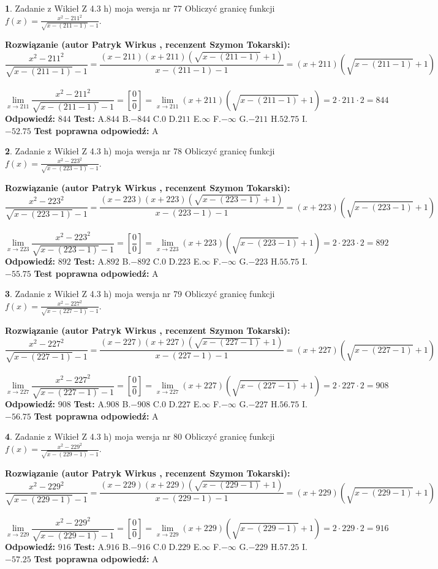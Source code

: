 \documentclass[12pt, a4paper]{article}
\theoremstyle{definition} %
\newtheorem{zad}{}
\newcommand{\zadStart}[1]{\begin{zad}#1\newline}
\newcommand{\zadStop}{\end{zad}}
\newcommand{\rozwStart}[2]{\noindent \textbf{Rozwiązanie (autor #1 , recenzent #2): }\newline}
\newcommand{\rozwStop}{\newline}
\newcommand{\odpStart}{\noindent \textbf{Odpowiedź:}\newline}
\newcommand{\odpStop}{\newline}
\newcommand{\testStart}{\noindent \textbf{Test:}\newline}
\newcommand{\testStop}{\newline}
\newcommand{\kluczStart}{\noindent \textbf{Test poprawna odpowiedź:}\newline}
\newcommand{\kluczStop}{\newline}
\begin{document}
\zadStart{Zadanie z Wikieł Z 4.3 h) moja wersja nr 77}
Obliczyć granicę funkcji $f(x)=\frac{x^{2} - 211^{2}}{\sqrt{x-(211-1)}-1}$.
\zadStop
\rozwStart{Patryk Wirkus}{Szymon Tokarski}
$$\frac{x^{2} - 211^{2}}{\sqrt{x-(211-1)}-1}=\frac{(x-211)(x+211)(\sqrt{x-(211-1)}+1)}{x-(211-1)-1}=(x+211)(\sqrt{x-(211-1)}+1)$$
\\
$$\lim\limits_{x\to 211}\frac{x^{2} - 211^{2}}{\sqrt{x-(211-1)}-1}=[\frac{0}{0}]=
\lim\limits_{x\to 211}(x+211)(\sqrt{x-(211-1)}+1) = 2\cdot211 \cdot 2 = 844$$
\rozwStop
\odpStart
$844$
\odpStop
\testStart
A.$844$
B.$-844$
C.$0$
D.$211$
E.$\infty$
F.$-\infty$
G.$-211$
H.$52.75$
I.$-52.75$
\testStop
\kluczStart
A
\kluczStop



\zadStart{Zadanie z Wikieł Z 4.3 h) moja wersja nr 78}
Obliczyć granicę funkcji $f(x)=\frac{x^{2} - 223^{2}}{\sqrt{x-(223-1)}-1}$.
\zadStop
\rozwStart{Patryk Wirkus}{Szymon Tokarski}
$$\frac{x^{2} - 223^{2}}{\sqrt{x-(223-1)}-1}=\frac{(x-223)(x+223)(\sqrt{x-(223-1)}+1)}{x-(223-1)-1}=(x+223)(\sqrt{x-(223-1)}+1)$$
\\
$$\lim\limits_{x\to 223}\frac{x^{2} - 223^{2}}{\sqrt{x-(223-1)}-1}=[\frac{0}{0}]=
\lim\limits_{x\to 223}(x+223)(\sqrt{x-(223-1)}+1) = 2\cdot223 \cdot 2 = 892$$
\rozwStop
\odpStart
$892$
\odpStop
\testStart
A.$892$
B.$-892$
C.$0$
D.$223$
E.$\infty$
F.$-\infty$
G.$-223$
H.$55.75$
I.$-55.75$
\testStop
\kluczStart
A
\kluczStop



\zadStart{Zadanie z Wikieł Z 4.3 h) moja wersja nr 79}
Obliczyć granicę funkcji $f(x)=\frac{x^{2} - 227^{2}}{\sqrt{x-(227-1)}-1}$.
\zadStop
\rozwStart{Patryk Wirkus}{Szymon Tokarski}
$$\frac{x^{2} - 227^{2}}{\sqrt{x-(227-1)}-1}=\frac{(x-227)(x+227)(\sqrt{x-(227-1)}+1)}{x-(227-1)-1}=(x+227)(\sqrt{x-(227-1)}+1)$$
\\
$$\lim\limits_{x\to 227}\frac{x^{2} - 227^{2}}{\sqrt{x-(227-1)}-1}=[\frac{0}{0}]=
\lim\limits_{x\to 227}(x+227)(\sqrt{x-(227-1)}+1) = 2\cdot227 \cdot 2 = 908$$
\rozwStop
\odpStart
$908$
\odpStop
\testStart
A.$908$
B.$-908$
C.$0$
D.$227$
E.$\infty$
F.$-\infty$
G.$-227$
H.$56.75$
I.$-56.75$
\testStop
\kluczStart
A
\kluczStop



\zadStart{Zadanie z Wikieł Z 4.3 h) moja wersja nr 80}
Obliczyć granicę funkcji $f(x)=\frac{x^{2} - 229^{2}}{\sqrt{x-(229-1)}-1}$.
\zadStop
\rozwStart{Patryk Wirkus}{Szymon Tokarski}
$$\frac{x^{2} - 229^{2}}{\sqrt{x-(229-1)}-1}=\frac{(x-229)(x+229)(\sqrt{x-(229-1)}+1)}{x-(229-1)-1}=(x+229)(\sqrt{x-(229-1)}+1)$$
\\
$$\lim\limits_{x\to 229}\frac{x^{2} - 229^{2}}{\sqrt{x-(229-1)}-1}=[\frac{0}{0}]=
\lim\limits_{x\to 229}(x+229)(\sqrt{x-(229-1)}+1) = 2\cdot229 \cdot 2 = 916$$
\rozwStop
\odpStart
$916$
\odpStop
\testStart
A.$916$
B.$-916$
C.$0$
D.$229$
E.$\infty$
F.$-\infty$
G.$-229$
H.$57.25$
I.$-57.25$
\testStop
\kluczStart
A
\kluczStop
\end{document}
